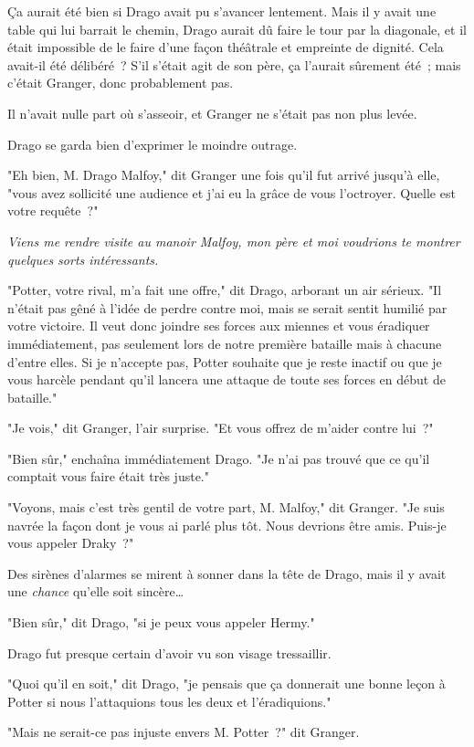Ça aurait été bien si Drago avait pu s'avancer lentement. Mais il y avait une table qui lui barrait le chemin, Drago aurait dû faire le tour par la diagonale, et il était impossible de le faire d'une façon théâtrale et empreinte de dignité. Cela avait-il été délibéré~? S'il s'était agit de son père, ça l'aurait sûrement été~; mais c'était Granger, donc probablement pas.

Il n'avait nulle part où s'asseoir, et Granger ne s'était pas non plus levée.

Drago se garda bien d'exprimer le moindre outrage.

"Eh bien, M. Drago Malfoy," dit Granger une fois qu'il fut arrivé jusqu'à elle, "vous avez sollicité une audience et j'ai eu la grâce de vous l'octroyer. Quelle est votre requête~?"

\emph{Viens me rendre visite au manoir Malfoy, mon père et moi voudrions te montrer quelques sorts intéressants.}

"Potter, votre rival, m'a fait une offre," dit Drago, arborant un air sérieux. "Il n'était pas gêné à l'idée de perdre contre moi, mais se serait sentit humilié par votre victoire. Il veut donc joindre ses forces aux miennes et vous éradiquer immédiatement, pas seulement lors de notre première bataille mais à chacune d'entre elles. Si je n'accepte pas, Potter souhaite que je reste inactif ou que je vous harcèle pendant qu'il lancera une attaque de toute ses forces en début de bataille."

"Je vois," dit Granger, l'air surprise. "Et vous offrez de m'aider contre lui~?"

"Bien sûr," enchaîna immédiatement Drago. "Je n'ai pas trouvé que ce qu'il comptait vous faire était très juste."

"Voyons, mais c'est très gentil de votre part, M. Malfoy," dit Granger. "Je suis navrée la façon dont je vous ai parlé plus tôt. Nous devrions être amis. Puis-je vous appeler Draky~?"

Des sirènes d'alarmes se mirent à sonner dans la tête de Drago, mais il y avait une \emph{chance} qu'elle soit sincère…

"Bien sûr," dit Drago, "si je peux vous appeler Hermy."

Drago fut presque certain d'avoir vu son visage tressaillir.

"Quoi qu'il en soit," dit Drago, "je pensais que ça donnerait une bonne leçon à Potter si nous l'attaquions tous les deux et l'éradiquions."

"Mais ne serait-ce pas injuste envers M. Potter~?" dit Granger.

